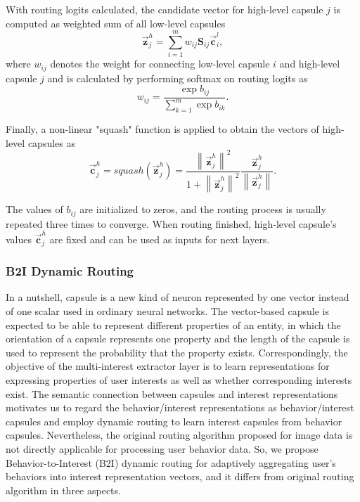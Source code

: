 \documentclass[sigconf]{acmart}
\begin{document}
With routing logits calculated, the candidate vector for high-level capsule $j$ is computed as weighted sum of all low-level capsules
\begin{equation}
\overrightarrow{\boldsymbol{z}}_j^{h} = \sum_{i=1}^{m} w_{ij} \boldsymbol{\textrm{S}}_{ij} \overrightarrow{\boldsymbol{c}}_i^{l},
\end{equation}
where $w_{ij}$ denotes the weight for connecting low-level capsule $i$ and high-level capsule $j$ and is calculated by performing softmax on routing logits as
\begin{equation}
w_{ij} = \frac{\exp{b_{ij}}}{\sum_{k=1}^{m} \exp{b_{ik}}}.
\end{equation}

Finally, a non-linear "squash" function is applied to obtain the vectors of high-level capsules as
\begin{equation}
\overrightarrow{\boldsymbol{c}}_{j}^{h} = squash(\overrightarrow{\boldsymbol{z}}_j^{h}) = \frac{\left\lVert \overrightarrow{\boldsymbol{z}}_j^{h} \right\rVert ^ 2}{1 + \left\lVert \overrightarrow{\boldsymbol{z}}_j^{h} \right\rVert ^ 2} \frac{\overrightarrow{\boldsymbol{z}}_j^{h}}{\left\lVert \overrightarrow{\boldsymbol{z}}_j^{h} \right\rVert}.
\end{equation}


The values of $b_{ij}$ are initialized to zeros, and the routing process is usually repeated three times to converge.
When routing finished, high-level capsule's values $\overrightarrow{\boldsymbol{c}}_j^h$ are fixed and can be used as inputs for next layers.\

\subsubsection{B2I Dynamic Routing}
\label{sec:b2i}
In a nutshell, capsule is a new kind of neuron represented by one vector instead of one scalar used in ordinary neural networks.
The vector-based capsule is expected to be able to represent different properties of an entity, in which the orientation of a capsule represents one property and the length of the capsule is used to represent the probability that the property exists.
Correspondingly, the objective of the multi-interest extractor layer is to learn representations for expressing properties of user interests as well as whether corresponding interests exist.
The semantic connection between capsules and interest representations motivates us to regard the behavior/interest representations as behavior/interest capsules and employ dynamic routing to learn interest capsules from behavior capsules.
Nevertheless, the original routing algorithm proposed for image data is not directly applicable for processing user behavior data.
So, we propose Behavior-to-Interest (B2I) dynamic routing for adaptively aggregating user's behaviors into interest representation vectors, and it differs from original routing algorithm in three aspects.
\end{document}
